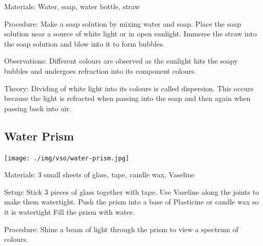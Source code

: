 \begin{multicols}{2}

\begin{description*}
\item[Materials:]{Water, soap, water bottle, straw}
\item[Procedure:]{Make a soap solution by mixing water and soap. Place the soap solution near a source of white light or in open sunlight. Immerse the straw into the soap solution and blow into it to form bubbles.}
\item[Observations:]{Different colours are observed as the sunlight hits the soapy bubbles and undergoes refraction into its component colours.}
\item[Theory:]{Dividing of white light into its colours is called dispersion. This occurs because the light is refracted when passing into the soap and then again when passing back into air.}
\end{description*}

\subsection{Water Prism}

\begin{center}
\texttt{[image: ./img/vso/water-prism.jpg]}
\end{center}

\begin{description*}
\item[Materials:]{3 small sheets of glass, tape, candle wax, Vaseline}
\item[Setup:]{Stick 3 pieces of glass together with tape. Use Vaseline along the joints to make them watertight. Push the prism into a base of Plasticine or candle wax so it is watertight Fill the prism with water.}
\item[Procedure:]{Shine a beam of light through the prism to view a spectrum of colours.}
\end{description*}


\end{multicols}
